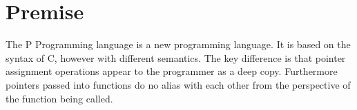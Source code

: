 \section{Premise}
The P Programming language is a new programming language. It is based on the syntax of C, however with different semantics. The key difference is that pointer assignment 
operations appear to the programmer as a deep copy. Furthermore pointers passed into functions do no alias with each other from the perspective of the function being 
called.
